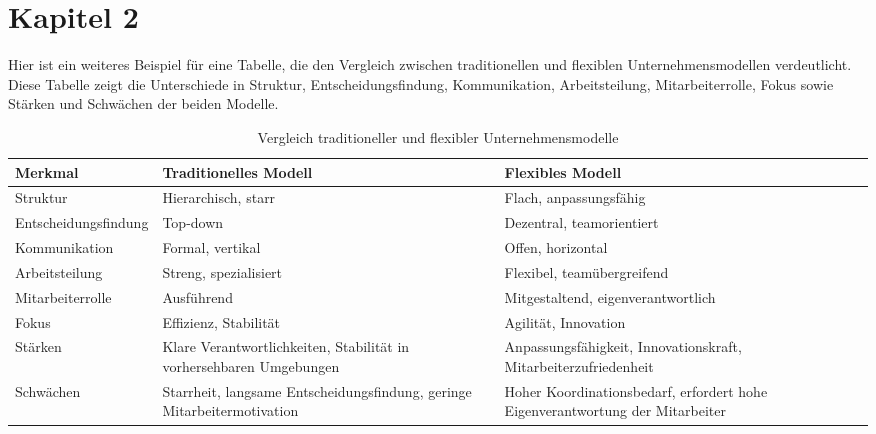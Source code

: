 \cleardoublepage
\section{Kapitel 2}
\label{sec:kap2}

Hier ist ein weiteres Beispiel für eine Tabelle, die den Vergleich zwischen traditionellen und flexiblen Unternehmensmodellen verdeutlicht. Diese Tabelle zeigt die Unterschiede in Struktur, Entscheidungsfindung, Kommunikation, Arbeitsteilung, Mitarbeiterrolle, Fokus sowie Stärken und Schwächen der beiden Modelle.
\begin{table}[H]
    \centering
    \caption{Vergleich traditioneller und flexibler Unternehmensmodelle}
    \label{tab:vergleich_modelle}
    \begin{tabular}{|p{4cm}|p{5cm}|p{5cm}|}
        \hline
        \textbf{Merkmal} & \textbf{Traditionelles Modell} & \textbf{Flexibles Modell} \\ \hline
        Struktur & Hierarchisch, starr & Flach, anpassungsfähig \\ \hline
        Entscheidungsfindung & Top-down & Dezentral, teamorientiert \\ \hline
        Kommunikation & Formal, vertikal & Offen, horizontal \\ \hline
        Arbeitsteilung & Streng, spezialisiert & Flexibel, teamübergreifend \\ \hline
        Mitarbeiterrolle & Ausführend & Mitgestaltend, eigenverantwortlich \\ \hline
        Fokus & Effizienz, Stabilität & Agilität, Innovation \\ \hline
        Stärken & Klare Verantwortlichkeiten, Stabilität in vorhersehbaren Umgebungen & Anpassungsfähigkeit, Innovationskraft, Mitarbeiterzufriedenheit \\ \hline
        Schwächen & Starrheit, langsame Entscheidungsfindung, geringe Mitarbeitermotivation & Hoher Koordinationsbedarf, erfordert hohe Eigenverantwortung der Mitarbeiter \\ \hline
    \end{tabular}
\end{table}